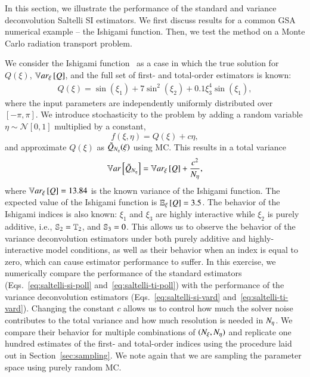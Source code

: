 In this section, we illustrate the performance of the standard and variance deconvolution Saltelli SI estimators. 
We first discuss results for a common GSA numerical example -- the Ishigami function.
Then, we test the method on a Monte Carlo radiation transport problem.

We consider the Ishigami function~\cite{ishigami-homma-1990} as a case in which the true solution for $Q(\xi)$, $\Vxi{Q}$, and the full set of first- and total-order estimators is known:
\begin{gather}
    Q(\xi) = \sin \left( \xi_1 \right) + 7 \sin^2 \left( \xi_2 \right) + 0.1 \xi_3^4 \sin \left( \xi_1 \right) ,
\end{gather}
where the input parameters are independently uniformly distributed over $\left[-\pi, \pi\right]$.
We introduce stochasticity to the problem by adding a random variable $\eta \sim \mathcal{N} \left[0,1\right]$ multiplied by a constant,
\begin{equation}
    f(\xi,\eta) = Q(\xi) + c \eta ,
\end{equation}
and approximate $Q(\xi)$ as $\Qpoll(\xi)$ using MC.  
This results in a total variance 
\begin{equation}
    \Var{\Qpoll} = \Vxi{Q} + \frac{c^2}{\Neta},
\end{equation}
where $\Vxi{Q}=13.84$ is the known variance of the Ishigami function.
The expected value of the Ishigami function is $\EExi{Q} = 3.5$.
The behavior of the Ishigami indices is also known: $\xi_1$ and $\xi_3$ are highly interactive while $\xi_2$ is purely additive, i.e., $\S{2} = \T{2}$, and $\S{3}=0$.
This allows us to observe the behavior of the variance deconvolution estimators under both purely additive and highly-interactive model conditions, as well as their behavior when an index is equal to zero, which can cause estimator performance to suffer.
In this exercise, we numerically compare the performance of the standard estimators (Eqs.~\eqref{eq:saltelli-si-poll} and~\eqref{eq:saltelli-ti-poll}) with the performance of the variance deconvolution estimators (Eqs.~\eqref{eq:saltelli-si-vard} and~\eqref{eq:saltelli-ti-vard}).
Changing the constant $c$ allows us to control how much the solver noise contributes to the total variance and how much resolution is needed in $\Neta$.
We compare their behavior for multiple combinations of $(\Nxi, \Neta)$ and replicate one hundred estimates of the first- and total-order indices using the procedure laid out in Section~\ref{sec:sampling}.
We note again that we are sampling the parameter space using purely random MC.

